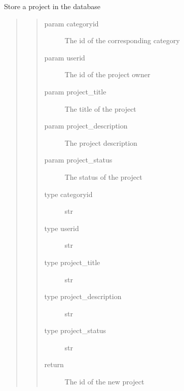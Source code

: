 \documentclass[letterpaper,10pt,english]{sphinxmanual}
\begin{document}

\begin{fulllineitems}
\label{\detokenize{index:models.project.set_project}}
Store a project in the database
\begin{quote}
\begin{quote}\begin{description}
\item[{param categoryid}] \leavevmode
The id of the corresponding category

\item[{param userid}] \leavevmode
The id of the project owner

\item[{param project\_title}] \leavevmode
The title of the project

\item[{param project\_description}] \leavevmode
The project description

\item[{param project\_status}] \leavevmode
The status of the project

\item[{type categoryid}] \leavevmode
str

\item[{type userid}] \leavevmode
str

\item[{type project\_title}] \leavevmode
str

\item[{type project\_description}] \leavevmode
str

\item[{type project\_status}] \leavevmode
str

\item[{return}] \leavevmode
The id of the new project

\end{description}\end{quote}
\end{quote}

\end{fulllineitems}

\end{document}
